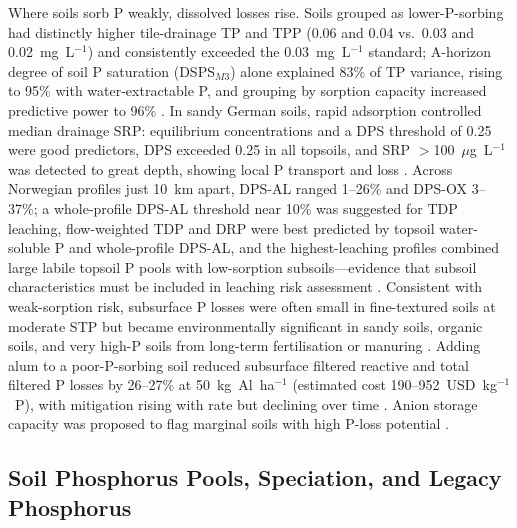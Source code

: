 Where soils sorb P weakly, dissolved losses rise. Soils grouped as lower-P-sorbing had
distinctly higher tile-drainage TP and TPP (0.06 and 0.04 vs.\ 0.03 and 0.02~mg~L$^{-1}$)
and consistently exceeded the 0.03~mg~L$^{-1}$ standard; A-horizon degree of soil P
saturation (DSPS$_{M3}$) alone explained 83\% of TP variance, rising to 95\% with
water-extractable P, and grouping by sorption capacity increased predictive power to
96\% \parencite{Beauchemin2003}. In sandy German soils, rapid adsorption controlled
median drainage SRP: equilibrium concentrations and a DPS threshold of 0.25 were good
predictors, DPS exceeded 0.25 in all topsoils, and SRP $>$100~$\mu$g~L$^{-1}$ was
detected to great depth, showing local P transport and loss \parencite{Siemens2004}.
Across Norwegian profiles just 10~km apart, DPS-AL ranged 1--26\% and DPS-OX 3--37\%; a
whole-profile DPS-AL threshold near 10\% was suggested for TDP leaching, flow-weighted
TDP and DRP were best predicted by topsoil water-soluble P and whole-profile DPS-AL,
and the highest-leaching profiles combined large labile topsoil P pools with
low-sorption subsoils---evidence that subsoil characteristics must be included in
leaching risk assessment \parencite{Liu2024b}. Consistent with weak-sorption risk,
subsurface P losses were often small in fine-textured soils at moderate STP but became
environmentally significant in sandy soils, organic soils, and very high-P soils from
long-term fertilisation or manuring \parencite{Sims1998}. Adding alum to a
poor-P-sorbing soil reduced subsurface filtered reactive and total filtered P losses by
26--27\% at 50~kg~Al~ha$^{-1}$ (estimated cost 190--952~USD~kg$^{-1}$~P), with
mitigation rising with rate but declining over time \parencite{McDowell2015}. Anion
storage capacity was proposed to flag marginal soils with high P-loss potential
\parencite{McDowell2015b}.

\subsection{Soil Phosphorus Pools, Speciation, and Legacy Phosphorus}

